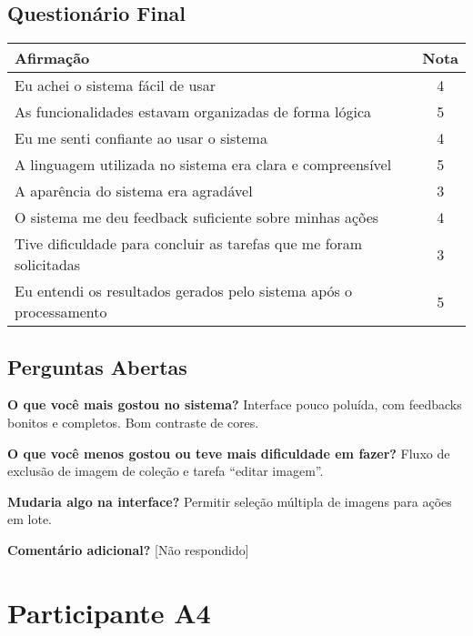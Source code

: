 \subsection*{Questionário Final}
\begin{center}
\begin{tabular}{|p{10cm}|c|}
\hline
\textbf{Afirmação} & \textbf{Nota} \\
\hline
Eu achei o sistema fácil de usar & 4 \\
As funcionalidades estavam organizadas de forma lógica & 5 \\
Eu me senti confiante ao usar o sistema & 4 \\
A linguagem utilizada no sistema era clara e compreensível & 5 \\
A aparência do sistema era agradável & 3 \\
O sistema me deu feedback suficiente sobre minhas ações & 4 \\
Tive dificuldade para concluir as tarefas que me foram solicitadas & 3 \\
Eu entendi os resultados gerados pelo sistema após o processamento & 5 \\
\hline
\end{tabular}
\end{center}

\subsection*{Perguntas Abertas}
\textbf{O que você mais gostou no sistema?} Interface pouco poluída, com feedbacks bonitos e completos. Bom contraste de cores.

\textbf{O que você menos gostou ou teve mais dificuldade em fazer?} Fluxo de exclusão de imagem de coleção e tarefa “editar imagem”.

\textbf{Mudaria algo na interface?} Permitir seleção múltipla de imagens para ações em lote.

\textbf{Comentário adicional?} [Não respondido]

\newpage
\section*{Participante A4}


